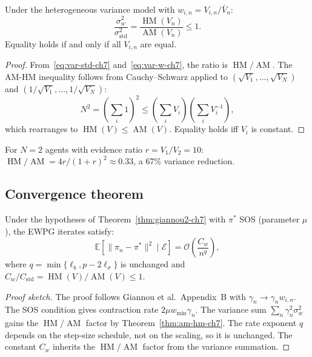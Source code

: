 \begin{theorem}
\label{thm:am-hm-ch7}
Under the heterogeneous variance model with $w_{i,n} = V_{i,n}/\bar{V}_n$:
\begin{equation}
\label{eq:am-hm-ch7}
\boxed{
    \frac{\sigma_w^2}{\sigma_{\mathrm{std}}^2} = \frac{\operatorname{HM}(V_n)}{\operatorname{AM}(V_n)} \leq 1.
}
\end{equation}
Equality holds if and only if all $V_{i,n}$ are equal.
\end{theorem}

\begin{proof}
From~\eqref{eq:var-std-ch7} and~\eqref{eq:var-w-ch7}, the ratio is $\operatorname{HM}/\operatorname{AM}$. The AM-HM inequality follows from Cauchy--Schwarz applied to $(\sqrt{V_1}, \ldots, \sqrt{V_N})$ and $(1/\sqrt{V_1}, \ldots, 1/\sqrt{V_N})$:
\[
    N^2 = \left(\sum_i 1\right)^2 \leq \left(\sum_i V_i\right)\left(\sum_i V_i^{-1}\right),
\]
which rearranges to $\operatorname{HM}(V) \leq \operatorname{AM}(V)$. Equality holds iff $V_i$ is constant.
\end{proof}

\begin{remark}
For $N = 2$ agents with evidence ratio $r = V_1/V_2 = 10$: $\operatorname{HM}/\operatorname{AM} = 4r/(1+r)^2 \approx 0.33$, a 67\% variance reduction.
\end{remark}

\subsection{Convergence theorem}

\begin{theorem}
\label{thm:ewpg-ch7}
Under the hypotheses of Theorem~\ref{thm:giannou2-ch7} with $\pi^*$ SOS (parameter $\mu$), the EWPG iterates satisfy:
\begin{equation}
    \mathbb{E}[\|\pi_n - \pi^*\|^2 \mid \mathcal{E}] = \mathcal{O}\!\left(\frac{C_w}{n^q}\right),
\end{equation}
where $q = \min\{\ell_b, p - 2\ell_\sigma\}$ is unchanged and $C_w / C_{\mathrm{std}} = \operatorname{HM}(V)/\operatorname{AM}(V) \leq 1$.
\end{theorem}

\begin{proof}[Proof sketch]
The proof follows Giannou et al.\ Appendix~B with $\gamma_n \to \gamma_n w_{i,n}$. The SOS condition gives contraction rate $2\mu w_{\min} \gamma_n$. The variance sum $\sum_n \gamma_n^2 \sigma_w^2$ gains the $\operatorname{HM}/\operatorname{AM}$ factor by Theorem~\ref{thm:am-hm-ch7}. The rate exponent $q$ depends on the step-size schedule, not on the scaling, so it is unchanged. The constant $C_w$ inherits the $\operatorname{HM}/\operatorname{AM}$ factor from the variance summation.
\end{proof}


